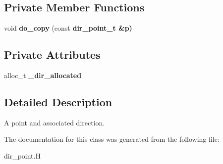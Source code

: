 \subsection*{Private Member Functions}
\begin{CompactItemize}
\item 
void \textbf{do\_\-copy} (const \bf{dir\_\-point\_\-t} \&p)\label{classASCbase_1_1dir__point__t_80fca05c410b767d5eff066f3e5708bd}

\end{CompactItemize}
\subsection*{Private Attributes}
\begin{CompactItemize}
\item 
alloc\_\-t \textbf{\_\-dir\_\-allocated}\label{classASCbase_1_1dir__point__t_14646e021c9e24eedf8a41ef4f6dc68d}

\end{CompactItemize}


\subsection{Detailed Description}
A point and associated direction. 



The documentation for this class was generated from the following file:\begin{CompactItemize}
\item 
dir\_\-point.H\end{CompactItemize}
